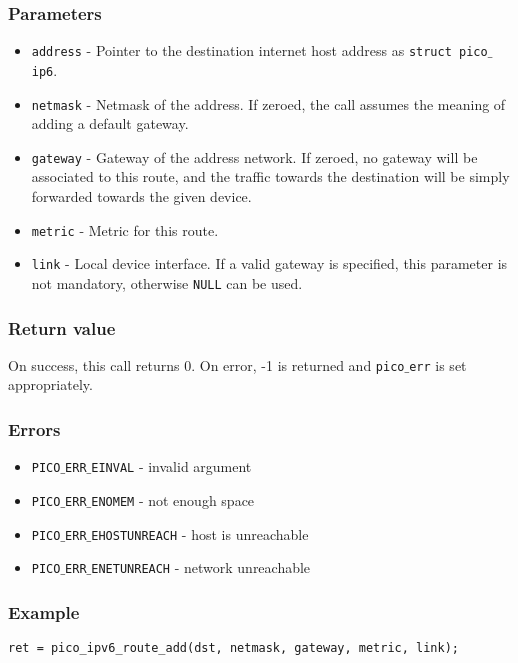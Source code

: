 \subsubsection*{Parameters}
\begin{itemize}[noitemsep]
\item \texttt{address} - Pointer to the destination internet host address as \texttt{struct pico$\_$ip6}.
\item \texttt{netmask} - Netmask of the address. If zeroed, the call assumes the meaning of adding a default gateway.
\item \texttt{gateway} - Gateway of the address network. If zeroed, no gateway will be associated to this route, and the traffic towards the destination will be simply forwarded towards the given device.
\item \texttt{metric} - Metric for this route.
\item \texttt{link} - Local device interface. If a valid gateway is specified, this parameter is not mandatory, otherwise \texttt{NULL} can be used.
\end{itemize}

\subsubsection*{Return value}
On success, this call returns 0. On error, -1 is returned and \texttt{pico$\_$err} is set appropriately. 

\subsubsection*{Errors}
\begin{itemize}[noitemsep]
\item \texttt{PICO$\_$ERR$\_$EINVAL} - invalid argument
\item \texttt{PICO$\_$ERR$\_$ENOMEM} - not enough space
\item \texttt{PICO$\_$ERR$\_$EHOSTUNREACH} - host is unreachable
\item \texttt{PICO$\_$ERR$\_$ENETUNREACH} - network unreachable
\end{itemize}

\subsubsection*{Example}
\begin{verbatim}
ret = pico_ipv6_route_add(dst, netmask, gateway, metric, link);
\end{verbatim}



